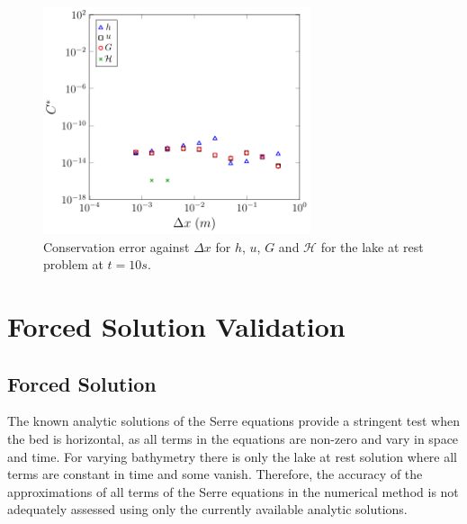 \documentclass[times]{elsarticle}
\begin{document}
\begin{figure}
	\centering
		\includegraphics[width=0.7\textwidth]{./Figures/LakeAtRest/C1num.pdf}
		\vspace{0.5cm}
	\caption{Conservation error against $\Delta x$ for $h$, $u$, $G$ and $\mathcal{H}$ for the lake at rest problem at $t=10s$.}
	\label{fig:LarC}
\end{figure}

\section{Forced Solution Validation}


	
\subsection{Forced Solution}

The known analytic solutions of the Serre equations provide a stringent test when the bed is horizontal, as all terms in the equations are non-zero and vary in space and time. For varying bathymetry there is only the lake at rest solution where all terms are constant in time and some vanish. Therefore, the accuracy of the approximations of all terms of the Serre equations in the numerical method is not adequately assessed using only the currently available analytic solutions.
\end{document}
